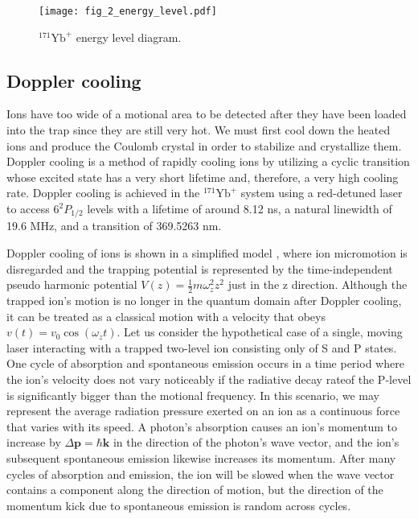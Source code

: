 \begin{figure}
    \centering
    \texttt{[image: fig\_2\_energy\_level.pdf]}
    \caption{${ }^{171} \mathrm{Yb}^{+}$ energy level diagram.}
    \label{fig:energy_level}
\end{figure}

\subsection{Doppler cooling}

Ions have too wide of a motional area to be detected after they have been loaded into the trap since they are still very hot. We must first cool down the heated ions and produce the Coulomb crystal in order to stabilize and crystallize them. Doppler cooling \cite{RN124,RN148,RN129,RN216} is a method of rapidly cooling ions by utilizing a cyclic transition whose excited state has a very short lifetime and, therefore, a very high cooling rate. Doppler cooling is achieved in the ${ }^{171} \mathrm{Yb}^{+}$ system using a red-detuned laser to access $6^2 P_{1 / 2}$ levels with a lifetime of around 8.12 ns, a natural linewidth of 19.6 MHz, and a transition of 369.5263 nm.

Doppler cooling of ions is shown in a simplified model \cite{RN152,RN154,RN243}, where ion micromotion is disregarded and the trapping potential is represented by the time-independent pseudo harmonic potential $V(z)=\frac{1}{2} m \omega_z^2 z^2$ just in the z direction. Although the trapped ion's motion is no longer in the quantum domain after Doppler cooling, it can be treated as a classical motion with a velocity that obeys $v(t)=v_0 \cos \left(\omega_z t\right)$. Let us consider the hypothetical case of a single, moving laser interacting with a trapped two-level ion consisting only of S and P states. One cycle of absorption and spontaneous emission occurs in a time period where the ion's velocity does not vary noticeably if the radiative decay rateof the P-level is significantly bigger than the motional frequency. In this scenario, we may represent the average radiation pressure exerted on an ion as a continuous force that varies with its speed. A photon's absorption causes an ion's momentum to increase by $\Delta \mathbf{p}=\hbar \mathbf{k}$ in the direction of the photon's wave vector, and the ion's subsequent spontaneous emission likewise increases its momentum. After many cycles of absorption and emission, the ion will be slowed when the wave vector contains a component along the direction of motion, but the direction of the momentum kick due to spontaneous emission is random across cycles.

